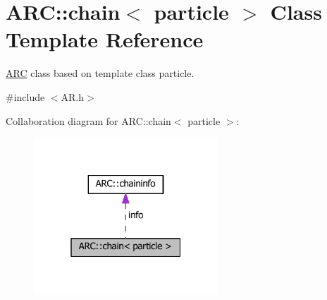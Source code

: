 \hypertarget{classARC_1_1chain}{}\section{A\+RC\+:\+:chain$<$ particle $>$ Class Template Reference}
\label{classARC_1_1chain}


\hyperlink{namespaceARC}{A\+RC} class based on template class particle.  




{\ttfamily \#include $<$A\+R.\+h$>$}



Collaboration diagram for A\+RC\+:\+:chain$<$ particle $>$\+:
\nopagebreak
\begin{figure}[H]
\begin{center}
\leavevmode
\includegraphics[width=196pt]{classARC_1_1chain__coll__graph}
\end{center}
\end{figure}
